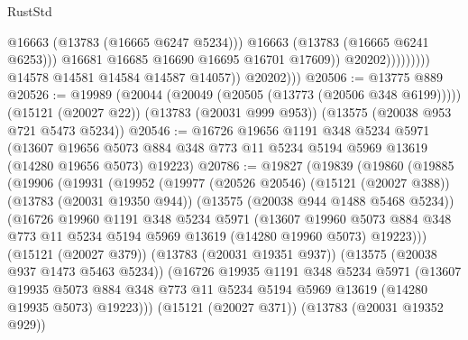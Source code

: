 \begin{lexlean}{RustStd}
\begin{coremodule}
                                        @16663
                                        (@13783 (@16665 @6247 @5234)))
                                      @16663
                                      (@13783 (@16665 @6241 @6253)))
                                    @16681
                                    @16685
                                    @16690
                                    @16695
                                    @16701
                                    @17609))
                                @20202)))))))))
              @14578
              @14581
              @14584
              @14587
              @14057))
          @20202)))
@20506 := @13775 @889
@20526 := @19989
    (@20044 (@20049 (@20505 (@13773 (@20506 @348 @6199)))))
    (@15121 (@20027 @22))
    (@13783 (@20031 @999 @953))
    (@13575 (@20038 @953 @721 @5473 @5234))
@20546 := @16726
    @19656
    @1191
    @348
    @5234
    @5971
    (@13607 @19656 @5073 @884 @348 @773 @11 @5234 @5194 @5969 @13619 (@14280 @19656 @5073) @19223)
@20786 := @19827
    (@19839
      (@19860
        (@19885
          (@19906
            (@19931
              (@19952
                (@19977
                  (@20526 @20546)
                  (@15121 (@20027 @388))
                  (@13783 (@20031 @19350 @944))
                  (@13575 (@20038 @944 @1488 @5468 @5234))
                  (@16726
                    @19960
                    @1191
                    @348
                    @5234
                    @5971
                    (@13607
                      @19960
                      @5073
                      @884
                      @348
                      @773
                      @11
                      @5234
                      @5194
                      @5969
                      @13619
                      (@14280 @19960 @5073)
                      @19223)))
                (@15121 (@20027 @379))
                (@13783 (@20031 @19351 @937))
                (@13575 (@20038 @937 @1473 @5463 @5234))
                (@16726
                  @19935
                  @1191
                  @348
                  @5234
                  @5971
                  (@13607
                    @19935
                    @5073
                    @884
                    @348
                    @773
                    @11
                    @5234
                    @5194
                    @5969
                    @13619
                    (@14280 @19935 @5073)
                    @19223)))
              (@15121 (@20027 @371))
              (@13783 (@20031 @19352 @929))

\end{coremodule}
\end{lexlean}
